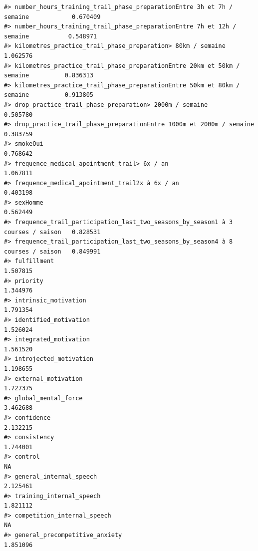 \documentclass[
]{article}
\begin{document}
\begin{verbatim}
#> number_hours_training_trail_phase_preparationEntre 3h et 7h / semaine            0.670409
#> number_hours_training_trail_phase_preparationEntre 7h et 12h / semaine           0.548971
#> kilometres_practice_trail_phase_preparation> 80km / semaine                      1.062576
#> kilometres_practice_trail_phase_preparationEntre 20km et 50km / semaine          0.836313
#> kilometres_practice_trail_phase_preparationEntre 50km et 80km / semaine          0.913805
#> drop_practice_trail_phase_preparation> 2000m / semaine                           0.505780
#> drop_practice_trail_phase_preparationEntre 1000m et 2000m / semaine              0.383759
#> smokeOui                                                                         0.768642
#> frequence_medical_apointment_trail> 6x / an                                      1.067811
#> frequence_medical_apointment_trail2x à 6x / an                                   0.403198
#> sexHomme                                                                         0.562449
#> frequence_trail_participation_last_two_seasons_by_season1 à 3 courses / saison   0.828531
#> frequence_trail_participation_last_two_seasons_by_season4 à 8 courses / saison   0.849991
#> fulfillment                                                                      1.507815
#> priority                                                                         1.344976
#> intrinsic_motivation                                                             1.791354
#> identified_motivation                                                            1.526024
#> integrated_motivation                                                            1.561520
#> introjected_motivation                                                           1.198655
#> external_motivation                                                              1.727375
#> global_mental_force                                                              3.462688
#> confidence                                                                       2.132215
#> consistency                                                                      1.744001
#> control                                                                                NA
#> general_internal_speech                                                          2.125461
#> training_internal_speech                                                         1.821112
#> competition_internal_speech                                                            NA
#> general_precompetitive_anxiety                                                   1.851096

\end{verbatim}
\end{document}
